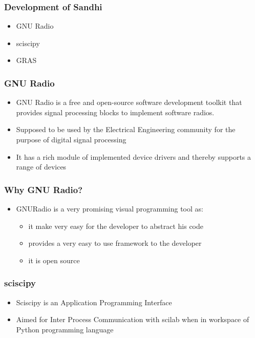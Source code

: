 \documentclass{beamer}
\begin{document}
\begin{frame}
        \frametitle{Development of Sandhi}
        \begin{itemize}
                \item GNU Radio
                \item sciscipy
                \item GRAS
        \end{itemize}
\end{frame}

\begin{frame}
        \frametitle{GNU Radio}
        \begin{itemize}
		\item GNU Radio is a free and open-source software development toolkit that provides signal processing blocks to implement software radios.
		\item Supposed to be used by the Electrical Engineering community for the purpose of digital signal processing 
		\item It has a rich module of implemented device drivers and thereby supports a range of devices
        \end{itemize}
\end{frame}

\begin{frame}
        \frametitle{Why GNU Radio?}
        \begin{itemize}
                \item GNURadio is a very promising visual programming tool as:
        \begin{itemize}
                \item it make very easy for the developer to abstract his code
                \item provides a very easy to use framework to the developer
                \item it is open source
        \end{itemize}
        \end{itemize}
\end{frame}

\begin{frame}
	\frametitle{sciscipy}
	\begin{itemize}
		\item Sciscipy is an Application Programming Interface 
		\item Aimed for Inter Process Communication with scilab when in workspace of Python programming language
	\end{itemize}
\end{frame}
\end{document}
